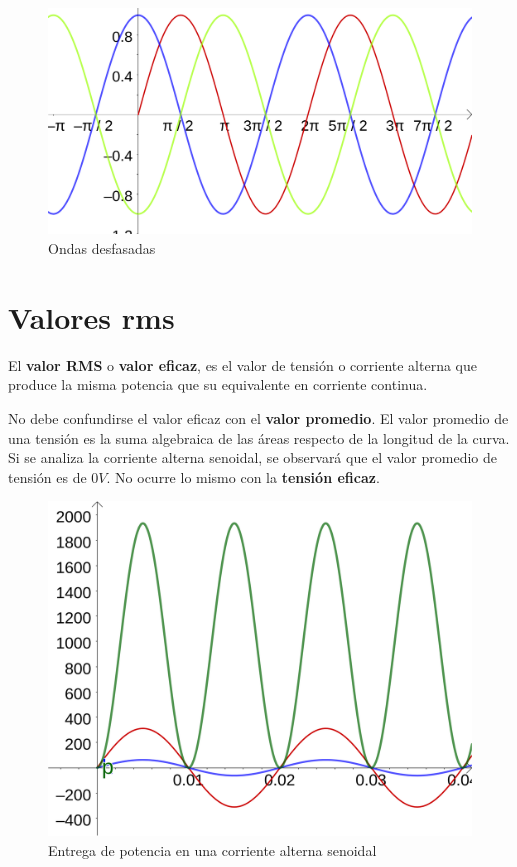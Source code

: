 \begin{figure}[htbp]
  \includegraphics[scale=0.14]{images/ejemplos_senos}
  \caption{Ondas desfasadas}
  \label{fig:ejemplos_senos}
\end{figure}

\section{Valores rms}
El \textbf{valor RMS} o \textbf{valor eficaz}, es el valor de tensión o corriente alterna que produce la misma potencia que su equivalente en corriente continua.

No debe confundirse el valor eficaz con el \textbf{valor promedio}. El valor promedio de una tensión es la suma algebraica de las áreas respecto de la longitud de la curva. Si se analiza la corriente alterna senoidal, se observará que el valor promedio de tensión es de $0 V$. No ocurre lo mismo con la \textbf{tensión eficaz}.

\begin{figure}[htbp]
  \includegraphics[scale=0.14]{images/potencia_alterna}
  \caption{Entrega de potencia en una corriente alterna senoidal}
  \label{fig:potencia_alterna}
\end{figure}

